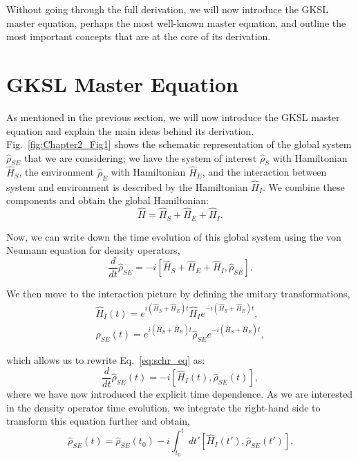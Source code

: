 Without going through the full derivation, we will now introduce the GKSL master equation, perhaps the most well-known master equation, and outline the most important concepts that are at the core of its derivation.

\section{GKSL Master Equation}

As mentioned in the previous section, we will now introduce the GKSL master equation and explain the main ideas behind its derivation. Fig.~\ref{fig:Chapter2_Fig1} shows the schematic representation of the global system $\hat{\rho}_{SE}$ that we are considering; we have the system of interest $\hat{\rho}_S$ with Hamiltonian $\hat{H}_S$, the environment $\hat{\rho}_E$ with Hamiltonian $\hat{H}_E$, and the interaction between system and environment is described by the Hamiltonian $\hat{H}_I$. We combine these components and obtain the global Hamiltonian:
\begin{equation}
    \hat{H} = \hat{H}_S + \hat{H}_E + \hat{H}_I.
\end{equation}

Now, we can write down the time evolution of this global system using the von Neumann equation for density operators, 
\begin{equation}
\label{eq:schr_eq}
    \frac{d}{dt} \hat{\rho}_{SE} = -i [\hat{H}_S+\hat{H}_E+\hat{H}_I, \hat{\rho}_{SE}].
\end{equation}

We then move to the interaction picture by defining the unitary transformations, 
\begin{equation}
\begin{aligned}
    \hat{H}_I(t) = e^{i (\hat{H}_S+\hat{H}_E)t} \hat{H}_I e^{-i (\hat{H}_S+\hat{H}_E)t},\\
    \hat{\rho}_{SE}(t) = e^{i (\hat{H}_S+\hat{H}_E)t} \hat{\rho}_{SE} e^{-i (\hat{H}_S+\hat{H}_E)t},
\end{aligned}
\end{equation}

which allows us to rewrite Eq.~\ref{eq:schr_eq} as:
\begin{equation}
\label{eq:schr_eq_se}
    \frac{d}{dt} \hat{\rho}_{SE}(t) = -i [\hat{H}_I(t), \hat{\rho}_{SE}(t)],
\end{equation}
where we have now introduced the explicit time dependence. As we are interested in the density operator time evolution, we integrate the right-hand side to transform this equation further and obtain, 
\begin{equation}
    \hat{\rho}_{SE}(t) = \hat{\rho}_{SE}(t_0) - i \int_{t_0}^t dt' [\hat{H}_I(t'),\hat{\rho}_{SE}(t')].
\end{equation}

